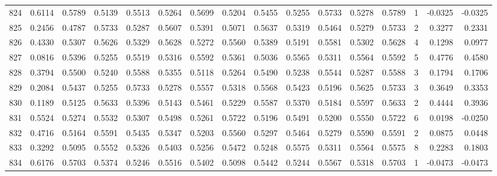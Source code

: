\begin{tabular}{lrrrrrrrrrrrrrrr}
824 &      0.6114 &  0.5789 &  0.5139 &  0.5513 &  0.5264 &  0.5699 &  0.5204 &  0.5455 &  0.5255 &  0.5733 &   0.5278 &     0.5789 &      1 &                   -0.0325 &                    -0.0325 \\
825 &      0.2456 &  0.4787 &  0.5733 &  0.5287 &  0.5607 &  0.5391 &  0.5071 &  0.5637 &  0.5319 &  0.5464 &   0.5279 &     0.5733 &      2 &                    0.3277 &                     0.2331 \\
826 &      0.4330 &  0.5307 &  0.5626 &  0.5329 &  0.5628 &  0.5272 &  0.5560 &  0.5389 &  0.5191 &  0.5581 &   0.5302 &     0.5628 &      4 &                    0.1298 &                     0.0977 \\
827 &      0.0816 &  0.5396 &  0.5255 &  0.5519 &  0.5316 &  0.5592 &  0.5361 &  0.5036 &  0.5565 &  0.5311 &   0.5564 &     0.5592 &      5 &                    0.4776 &                     0.4580 \\
828 &      0.3794 &  0.5500 &  0.5240 &  0.5588 &  0.5355 &  0.5118 &  0.5264 &  0.5490 &  0.5238 &  0.5544 &   0.5287 &     0.5588 &      3 &                    0.1794 &                     0.1706 \\
829 &      0.2084 &  0.5437 &  0.5255 &  0.5733 &  0.5278 &  0.5557 &  0.5318 &  0.5568 &  0.5423 &  0.5196 &   0.5625 &     0.5733 &      3 &                    0.3649 &                     0.3353 \\
830 &      0.1189 &  0.5125 &  0.5633 &  0.5396 &  0.5143 &  0.5461 &  0.5229 &  0.5587 &  0.5370 &  0.5184 &   0.5597 &     0.5633 &      2 &                    0.4444 &                     0.3936 \\
831 &      0.5524 &  0.5274 &  0.5532 &  0.5307 &  0.5498 &  0.5261 &  0.5722 &  0.5196 &  0.5491 &  0.5200 &   0.5550 &     0.5722 &      6 &                    0.0198 &                    -0.0250 \\
832 &      0.4716 &  0.5164 &  0.5591 &  0.5435 &  0.5347 &  0.5203 &  0.5560 &  0.5297 &  0.5464 &  0.5279 &   0.5590 &     0.5591 &      2 &                    0.0875 &                     0.0448 \\
833 &      0.3292 &  0.5095 &  0.5552 &  0.5326 &  0.5403 &  0.5256 &  0.5472 &  0.5248 &  0.5575 &  0.5311 &   0.5564 &     0.5575 &      8 &                    0.2283 &                     0.1803 \\
834 &      0.6176 &  0.5703 &  0.5374 &  0.5246 &  0.5516 &  0.5402 &  0.5098 &  0.5442 &  0.5244 &  0.5567 &   0.5318 &     0.5703 &      1 &                   -0.0473 &                    -0.0473 \\

\end{tabular}
